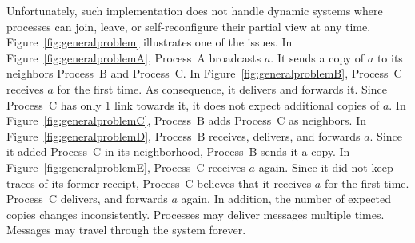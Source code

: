 \begin{figure*}
  \begin{center}
    \hspace{10pt}
    \hspace{10pt}
    \hspace{10pt}
    \hspace{10pt}
    \caption{\label{fig:generalproblem}A broadcast relying on counters may
      deliver messages multiple times leading to inconsistencies.}
  \end{center}
\end{figure*}


Unfortunately, such implementation does not handle dynamic systems where
processes can join, leave, or self-reconfigure their partial view at any
time. Figure~\ref{fig:generalproblem} illustrates one of the issues. In
Figure~\ref{fig:generalproblemA}, Process~A broadcasts $a$. It sends a copy of
$a$ to its neighbors Process~B and Process~C. In
Figure~\ref{fig:generalproblemB}, Process~C receives $a$ for the first time.  As
consequence, it delivers and forwards it. Since Process~C has only 1 link
towards it, it does not expect additional copies of $a$. In
Figure~\ref{fig:generalproblemC}, Process~B adds Process~C as neighbors. In
Figure~\ref{fig:generalproblemD}, Process~B receives, delivers, and forwards
$a$. Since it added Process~C in its neighborhood, Process~B sends it a copy.
In Figure~\ref{fig:generalproblemE}, Process~C receives $a$ again. Since it did
not keep traces of its former receipt, Process~C believes that it receives $a$
for the first time. Process~C delivers, and forwards $a$ again. In addition, the
number of expected copies changes inconsistently. Processes may deliver messages
multiple times. Messages may travel through the system forever.

